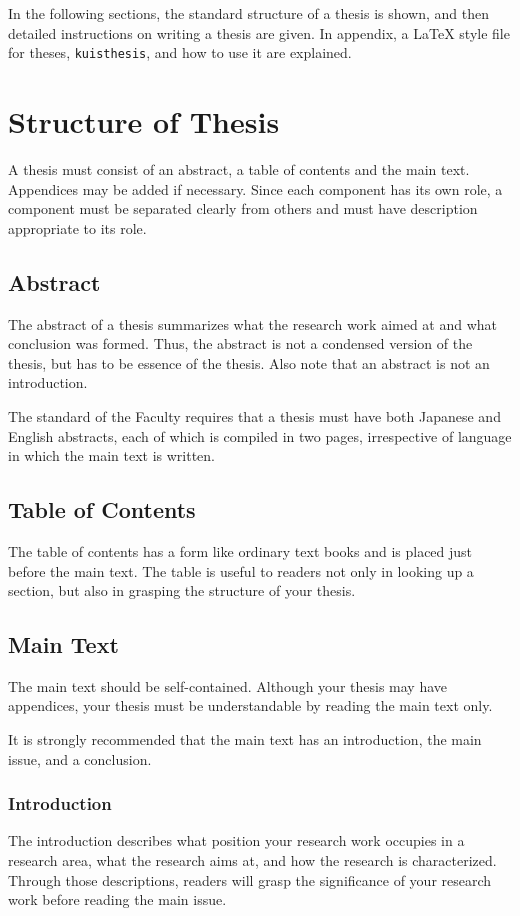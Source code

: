 \documentclass[english]{kuisthesis}
\begin{document}
In the following sections, the standard structure of a thesis is shown, and
then detailed instructions on writing a thesis are given.  In appendix, a
\LaTeX{} style file for theses, \verb|kuisthesis|, and how to use it are
explained.

\section{Structure of Thesis}\label{sec-structure}
A thesis must consist of an abstract, a table of contents and the main text.
Appendices may be added if necessary.  Since each component has its own role,
a component must be separated clearly from others and must have description
appropriate to its role.

\subsection{Abstract}\label{subsec-abstract}
The abstract of a thesis summarizes what the research work aimed at and what
conclusion was formed.  Thus, the abstract is not a condensed version of the
thesis, but has to be essence of the thesis.  Also note that an abstract
is not an introduction.

The standard of the Faculty requires that a thesis must have both
Japanese and English abstracts, each of which is compiled in two pages,
irrespective of language in which the main text is written.

\subsection{Table of Contents}\label{subsec-toc}
The table of contents has a form like ordinary text books and is placed just
before the main text.  The table is useful to readers not only in looking up
a section, but also in grasping the structure of your thesis.

\subsection{Main Text}\label{subsec-main}
The main text should be self-contained.  Although your thesis may have
appendices, your thesis must be understandable by reading the main text
only.

It is strongly recommended that the main text has an introduction, the main
issue, and a conclusion.

\subsubsection{Introduction}\label{subsubsec-intro}
The introduction describes what position your research work occupies in a
research area, what the research aims at, and how the research is
characterized.   Through those descriptions, readers will grasp the
significance of your research work before reading the main issue.
\end{document}
